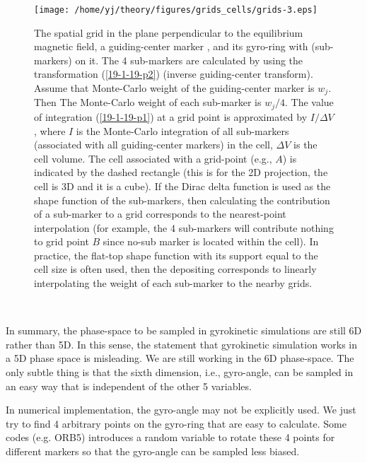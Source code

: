 \documentclass{article}
\newcommand{\tmcolor}[2]{{\color{#1}{#2}}}
\begin{document}
\begin{figure}[h]
  \texttt{[image: /home/yj/theory/figures/grids\_cells/grids-3.eps]}
  \caption{\label{19-1-19-p4}The spatial grid in the plane perpendicular to
  the equilibrium magnetic field, a guiding-center marker \tmcolor{red}{$C$},
  and its gyro-ring with \tmcolor{blue}{4 sampling points} (sub-markers) on
  it. The 4 sub-markers are calculated by using the transformation
  (\ref{19-1-19-p2}) (inverse guiding-center transform). Assume that
  Monte-Carlo weight of the guiding-center marker \tmcolor{red}{$C$} is $w_j$.
  Then The Monte-Carlo weight of each sub-marker is $w_j / 4$. The value of
  integration (\ref{19-1-19-p1}) at a grid point is approximated by $I /
  \Delta V$, where $I$ is the Monte-Carlo integration of all sub-markers
  (associated with all guiding-center markers) in the cell, $\Delta V$ is the
  cell volume. The cell associated with a grid-point (e.g., $A$) is indicated
  by the dashed rectangle (this is for the 2D projection, the cell is 3D and
  it is a cube). If the Dirac delta function is used as the shape function of
  the sub-markers, then calculating the contribution of a sub-marker to a grid
  corresponds to the nearest-point interpolation (for example, the 4
  sub-markers will contribute nothing to grid point $B$ since no-sub marker is
  located within the cell). In practice, the flat-top shape function with its
  support equal to the cell size is often used, then the depositing
  corresponds to linearly interpolating the weight of each sub-marker to the
  nearby grids.}
\end{figure}

\

In summary, the phase-space to be sampled in gyrokinetic simulations are
still 6D rather than 5D. In this sense, the statement that gyrokinetic
simulation works in a 5D phase space is misleading. We are still working in
the 6D phase-space. The only subtle thing is that the sixth dimension, i.e.,
gyro-angle, can be sampled in an easy way that is independent of the other 5
variables.

In numerical implementation, the gyro-angle may not be explicitly used. We
just try to find 4 arbitrary points on the gyro-ring that are easy to
calculate. Some codes (e.g. ORB5) introduces a random variable to rotate these
4 points for different markers so that the gyro-angle can be sampled less
biased.
\end{document}
